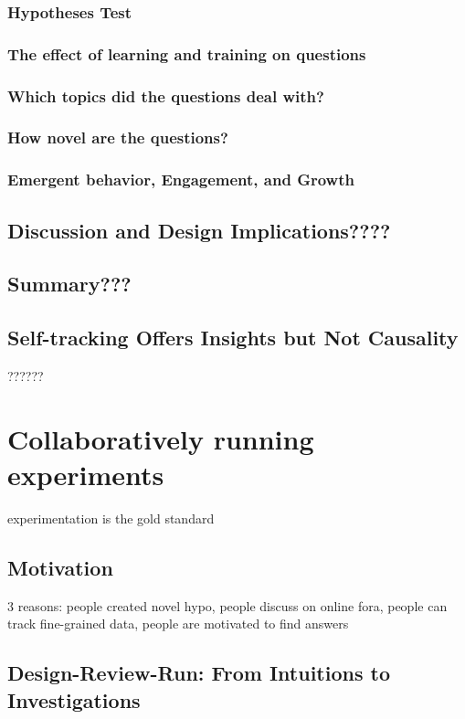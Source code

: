  \subsection{Hypotheses Test}
 \subsection{The effect of learning and training on questions}
 \subsection{Which topics did the questions deal with?}
 \subsection{How novel are the questions?}
 \subsection{Emergent behavior, Engagement, and Growth}

\section{Discussion and Design Implications????}
\section{Summary???}

\section{Self-tracking Offers Insights but Not Causality}
??????

\chapter{Collaboratively running experiments}

 experimentation is the gold standard

\section{Motivation}
3 reasons: people created novel hypo, people discuss on online fora, people can track fine-grained data, people are motivated to find answers


\section{Design-Review-Run: From Intuitions to Investigations}
